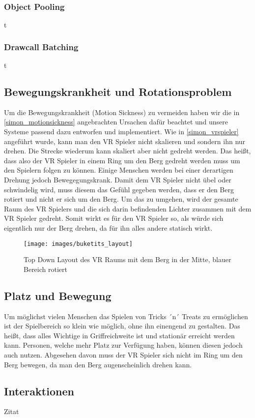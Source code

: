 \subsubsection{Object Pooling}
t

\subsubsection{Drawcall Batching}
t

\subsection{Bewegungskrankheit und Rotationsproblem}
Um die Bewegungskrankheit (Motion Sickness) zu vermeiden haben wir die in \ref{simon_motionsickness} angebrachten Ursachen dafür beachtet und unsere Systeme passend dazu entworfen und implementiert.
Wie in \ref{simon_vrspieler} angeführt wurde, kann man den VR Spieler nicht skalieren und sondern ihn nur drehen. Die Strecke wiederum kann skaliert aber nicht gedreht werden. Das heißt, dass also der VR Spieler in einem Ring um den Berg gedreht werden muss um den Spielern folgen zu können. Einige Menschen werden bei einer derartigen Drehung jedoch Bewegegungskrank. Damit dem VR Spieler nicht übel oder schwindelig wird, muss diesem das Gefühl gegeben werden, dass er den Berg rotiert und nicht er sich um den Berg. Um das zu umgehen, wird der gesamte Raum des VR Spielers und die sich darin befindenden Lichter zusammen mit dem VR Spieler gedreht. Somit wirkt es für den VR Spieler so, als würde sich eigentlich nur der Berg drehen, da für ihn alles andere statisch wirkt.

\begin{figure}[h]
	\centering
	\texttt{[image: images/buketits\_layout]}
	\caption{Top Down Layout des VR Raums mit dem Berg in der Mitte, blauer Bereich rotiert}
\end{figure}



\subsection{Platz und Bewegung}
Um möglichst vielen Menschen das Spielen von Tricks ´n´ Treats zu ermöglichen ist der Spielbereich so klein wie möglich, ohne ihn einengend zu gestalten. Das heißt, dass alles Wichtige in Griffreichweite ist und stationär erreicht werden kann. Personen, welche mehr Platz zur Verfügung haben, können diesen jedoch auch nutzen. Abgesehen davon muss der VR Spieler sich nicht im Ring um den Berg bewegen, da man den Berg augenscheinlich drehen kann.

\subsection{Interaktionen}
Zitat